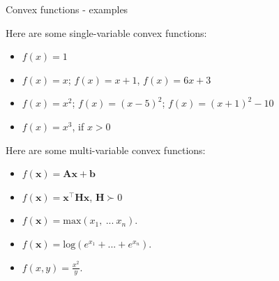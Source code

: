 \documentclass{beamer}
\begin{document}
\begin{frame}{Convex functions - examples}
	\begin{flushleft}
		
		Here are some single-variable convex functions: 
		
		\begin{itemize}
			\item $f(x) = 1$
			\item $f(x) = x$; $f(x) = x + 1$, $f(x) = 6x + 3$
			\item $f(x) = x^2$; $f(x) = (x - 5)^2$; $f(x) = (x + 1)^2 - 10$
			\item $f(x) = x^3$, if $x > 0$
		\end{itemize}
		
		\bigskip
		
		Here are some multi-variable convex functions: 
		
		\begin{itemize}
			\item $f(\mathbf{x}) = \mathbf{A}\mathbf{x} + \mathbf{b}$
			\item $f(\mathbf{x}) = \mathbf{x}^\top \mathbf{H}\mathbf{x}$, $\mathbf{H} \succ 0$ 
			
			\item $f(\mathbf{x}) = \text{max}(x_1, \ ... \ x_n) $.
			\item $f(\mathbf{x}) = \text{log}(e^{x_1}+ ... +e^{x_n}) $.
			\item $f(x, y) = \frac{x^2}{y}$.
		\end{itemize}
		
	\end{flushleft}
\end{frame}
\end{document}
